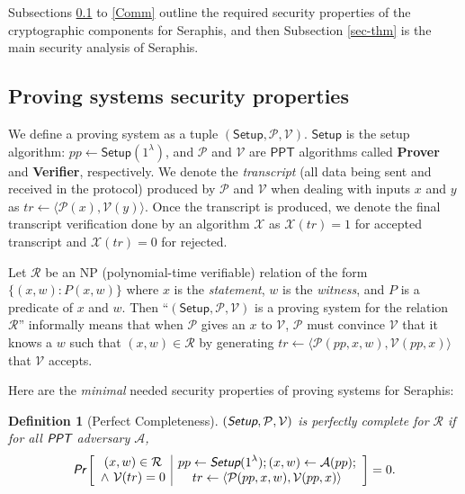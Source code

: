 \documentclass{article}
\newtheorem{definition}{Definition}[section]
\begin{document}
Subsections \ref{prov-prop} to \ref{Comm} outline the required security properties of the cryptographic components for Seraphis, and then Subsection \ref{sec-thm} is the main security analysis of Seraphis. %

\subsection{Proving systems security properties}\label{prov-prop}
We define a proving system as a tuple $(\textsf{Setup}, \mathcal{P}, \mathcal{V})$. $\textsf{Setup}$ is the setup algorithm: $pp\leftarrow\textsf{Setup}(1^{\lambda})$, and $\mathcal{P}$ and $\mathcal{V}$ are $\textsf{PPT}$ algorithms called \textbf{Prover} and \textbf{Verifier}, respectively. We denote the \textit{transcript} (all data being sent and received in the protocol) produced by $\mathcal{P}$ and $\mathcal{V}$ when dealing with inputs $x$ and $y$ as $tr\leftarrow\langle\mathcal{P}(x), \mathcal{V}(y)\rangle$. Once the transcript is produced, we denote the final transcript verification done by an algorithm $\mathcal{X}$ as $\mathcal{X}(tr)=1$ for accepted transcript and $\mathcal{X}(tr)=0$ for rejected. 

Let $\mathcal{R}$ be an NP (polynomial-time verifiable) relation of the form $\{(x,w):P(x, w)\}$ where $x$ is the \textit{statement}, $w$ is the \textit{witness}, and $P$ is a predicate of $x$ and $w$. Then ``$(\textsf{Setup}, \mathcal{P}, \mathcal{V})$ is a proving system for the relation $\mathcal{R}$'' informally means that when $\mathcal{P}$ gives an $x$ to $\mathcal{V}$, $\mathcal{P}$ must convince $\mathcal{V}$ that it knows a $w$ such that $(x,w)\in\mathcal{R}$ by generating $tr\leftarrow\langle\mathcal{P}(pp, x, w), \mathcal{V}(pp, x)\rangle$ that $\mathcal{V}$ accepts.

Here are the \textit{minimal} needed security properties of proving systems for Seraphis:

\begin{definition}[Perfect Completeness]
$(\emph{\textsf{Setup}}, \mathcal{P}, \mathcal{V})$ is perfectly complete for $\mathcal{R}$ if for all $\emph{\textsf{PPT}}$ adversary $\mathcal{A}$,
\begin{align*}
\emph{\textsf{Pr}}\left[
\begin{array}{c|c}
    \begin{gathered}
        (x,w)\in\mathcal{R}\\
        \wedge\ \mathcal{V}(tr) = 0
    \end{gathered}
    &
    \begin{gathered}
        pp\leftarrow\emph{\textsf{Setup}}(1^{\lambda}); (x, w)\leftarrow\mathcal{A}(pp); \\
        tr\leftarrow\langle\mathcal{P}(pp,x,w), \mathcal{V}(pp,x)\rangle
    \end{gathered}
\end{array}
\right]
= 0.
\end{align*}
\end{definition}
\end{document}
